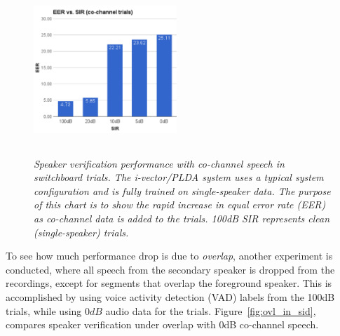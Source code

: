 \documentclass[journal]{IEEEtran}
\begin{document}
\begin{figure}[h!]
	\vspace{-1mm}
	\includegraphics[height = 2.5in, width=0.48\textwidth]{figures/eer_vs_sir_swb2_baseline}
	\vspace{-2mm}
	\caption{\it \small Speaker verification performance with co-channel speech in switchboard trials. The i-vector/PLDA system uses a typical system configuration and is fully trained on single-speaker data. The purpose of this chart is to show the rapid increase in equal error rate (EER) as co-channel data is added to the trials. 100dB SIR represents clean (single-speaker) trials.}
	\label{fig:cch_in_sid}
	\vspace{-1mm}
\end{figure}

To see how much performance drop is due to {\it overlap}, another experiment is conducted, where all speech from the secondary speaker is dropped from the recordings, except for segments that overlap the foreground speaker. 
This is accomplished by using voice activity detection (VAD) labels from the 100dB trials, while using $0dB$ audio data for the trials. 
Figure~\ref{fig:ovl_in_sid}, compares speaker verification under overlap with 0dB co-channel speech. 
\end{document}
